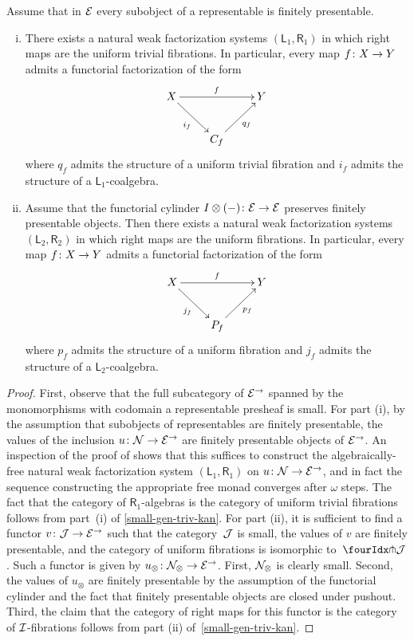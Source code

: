 \documentclass[reqno,10pt,a4paper,oneside,draft]{amsart}
\begin{document}
\begin{theorem} \label{thm:sset-cset-nwfs} Assume that in $\cal{E}$ every subobject of a representable is finitely presentable.
\begin{enumerate}[(i)]
\item There exists a natural weak factorization systems $(\mathsf{L}_1, \mathsf{R}_1)$ in which right maps are the uniform trivial fibrations.
In particular, every map $f \co X \to Y$ admits a functorial factorization of the form
\[
\xymatrix{
  X
  \ar[rr]^{f}
  \ar[dr]_{i_f}
&&
  Y
\\&
  C_f
  \ar[ur]_{q_f}
}
\]
where $q_f$ admits the structure of a uniform trivial fibration and $i_f$ admits the structure of a $\mathsf{L}_1$-coalgebra.
\item Assume that the functorial cylinder $\interval \otimes (-) \co \cal{E} \to \cal{E}$ preserves finitely presentable objects.
Then there exists a natural weak factorization systems $(\mathsf{L}_2, \mathsf{R}_2)$ in which right maps are the uniform fibrations.
In particular, every map $f \co X \to Y$ admits a functorial factorization of the form
\[
\xymatrix{
  X
  \ar[rr]^{f}
  \ar[dr]_{j_f}
&&
  Y
\\&
  P_f
  \ar[ur]_{p_f}
}
\]
where $p_f$ admits the structure of a uniform fibration and $j_f$ admits the structure of a $\mathsf{L}_2$-coalgebra.
\end{enumerate}
\end{theorem}

\begin{proof}
First, observe that the full subcategory of $\catE^\to$ spanned by the monomorphisms with codomain a representable presheaf is small.
For part (i), by the assumption that subobjects of representables are finitely presentable, the values of the inclusion $u \co \cal{N} \to \cal{E}^\to$ are finitely presentable objects of $\cal{E}^\to$.
An inspection of the proof of \cite[Proposition 4.22]{garner:small-object-argument} shows that this suffices to construct the algebraically-free natural weak factorization system $(\mathsf{L}_1, \mathsf{R}_1)$ on $u \co \cal{N} \to \cal{E}^\to$, and in fact the sequence constructing the appropriate free monad converges after $\omega$ steps.
The fact that the category of $\mathsf{R}_1$-algebras is the category of uniform trivial fibrations follows from part~(i) of \cref{small-gen-triv-kan}.
For part (ii), it is sufficient to find a functor $v \co \cal{J} \rightarrow \catE^\to$ such that the category~$\cal{J}$ is small, the values of $v$ are finitely presentable, and the category of uniform fibrations is isomorphic to~$\liftr{\cal{J}}$.
Such a functor is given by $u_\otimes \co \cal{N}_\otimes \rightarrow \catE^\to$.
First, $\cal{N}_\otimes$ is clearly small.
Second, the values of $u_\otimes$ are finitely presentable by the assumption of the functorial cylinder and the fact that finitely presentable objects are closed under pushout.
Third, the claim that the category of right maps for this functor is the category of $\cal{I}$-fibrations follows from part (ii) of~\cref{small-gen-triv-kan}.
\end{proof}
\end{document}
